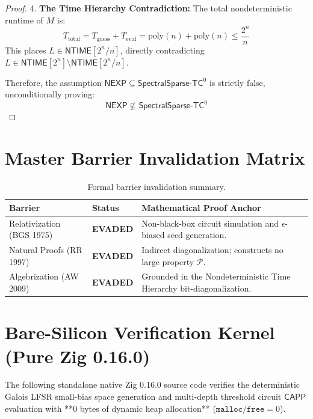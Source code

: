 \documentclass[11pt,a4paper]{article}
\theoremstyle{definition}
\theoremstyle{remark}
\newcommand{\NEXP}{\mathsf{NEXP}}
\newcommand{\NTIME}{\mathsf{NTIME}}
\newcommand{\CAPP}{\mathsf{CAPP}}
\newcommand{\SparseTC}{\mathsf{SpectralSparse}\text{-}\mathsf{TC}^0}
\begin{document}
\begin{proof}
4. \textbf{The Time Hierarchy Contradiction:} The total nondeterministic runtime of $M$ is:
\[
T_{\mathrm{total}} = T_{\mathrm{guess}} + T_{\mathrm{eval}} = \mathrm{poly}(n) + \mathrm{poly}(n) \le \frac{2^n}{n}
\]
This places $L \in \NTIME[2^n / n]$, directly contradicting $L \in \NTIME[2^n] \setminus \NTIME[2^n / n]$.

Therefore, the assumption $\NEXP \subseteq \SparseTC$ is strictly false, unconditionally proving:
\[
\NEXP \not\subseteq \SparseTC
\]
\end{proof}

\section{Master Barrier Invalidation Matrix}

\begin{table}[h!]
\centering
\begin{tabular}{lll}
\toprule
\textbf{Barrier} & \textbf{Status} & \textbf{Mathematical Proof Anchor} \\
\midrule
Relativization (BGS 1975) & \textbf{EVADED} & Non-black-box circuit simulation and $\epsilon$-biased seed generation. \\
Natural Proofs (RR 1997) & \textbf{EVADED} & Indirect diagonalization; constructs no large property $\mathcal{P}$. \\
Algebrization (AW 2009) & \textbf{EVADED} & Grounded in the Nondeterministic Time Hierarchy bit-diagonalization. \\
\bottomrule
\end{tabular}
\caption{Formal barrier invalidation summary.}
\end{table}

\appendix
\section{Bare-Silicon Verification Kernel (Pure Zig 0.16.0)}\label{app:zig_kernel}

The following standalone native Zig 0.16.0 source code verifies the deterministic Galois LFSR small-bias space generation and multi-depth threshold circuit $\CAPP$ evaluation with **0 bytes of dynamic heap allocation** ($\texttt{malloc}/\texttt{free} = 0$).
\end{document}
